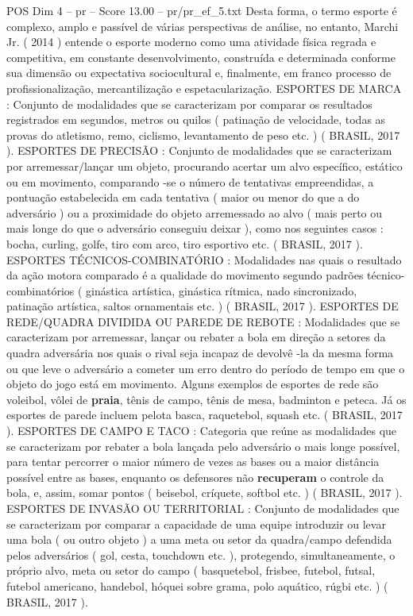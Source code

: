 \begin{textsample}{POS Dim 4 – pr – Score 13.00 – pr/pr\_ef\_5.txt}
Desta forma, o termo esporte é complexo, amplo e passível de várias perspectivas de análise, no entanto, Marchi Jr. ( 2014 ) entende o esporte moderno como uma atividade física regrada e competitiva, em constante desenvolvimento, construída e determinada conforme sua dimensão ou expectativa sociocultural e, finalmente, em franco processo de profissionalização, mercantilização e espetacularização.
ESPORTES DE MARCA : Conjunto de modalidades que se caracterizam por comparar os resultados registrados em segundos, metros ou quilos ( patinação de velocidade, todas as provas do atletismo, remo, ciclismo, levantamento de peso etc. ) ( BRASIL, 2017 ).
ESPORTES DE PRECISÃO : Conjunto de modalidades que se caracterizam por arremessar/lançar um objeto, procurando acertar um alvo específico, estático ou em movimento, comparando -se o número de tentativas empreendidas, a pontuação estabelecida em cada tentativa ( maior ou menor do que a do adversário ) ou a proximidade do objeto arremessado ao alvo ( mais perto ou mais longe do que o adversário conseguiu deixar ), como nos seguintes casos : bocha, curling, golfe, tiro com arco, tiro esportivo etc. ( BRASIL, 2017 ).
ESPORTES TÉCNICOS-COMBINATÓRIO : Modalidades nas quais o resultado da ação motora comparado é a qualidade do movimento segundo padrões técnico-combinatórios ( ginástica artística, ginástica rítmica, nado sincronizado, patinação artística, saltos ornamentais etc. ) ( BRASIL, 2017 ).
ESPORTES DE REDE/QUADRA DIVIDIDA OU PAREDE DE REBOTE : Modalidades que se caracterizam por arremessar, lançar ou rebater a bola em direção a setores da quadra adversária nos quais o rival seja incapaz de devolvê -la da mesma forma ou que leve o adversário a cometer um erro dentro do período de tempo em que o objeto do jogo está em movimento.
Alguns exemplos de esportes de rede são voleibol, vôlei de \textbf{praia}, tênis de campo, tênis de mesa, badminton e peteca.
Já os esportes de parede incluem pelota basca, raquetebol, squash etc. ( BRASIL, 2017 ).
ESPORTES DE CAMPO E TACO : Categoria que reúne as modalidades que se caracterizam por rebater a bola lançada pelo adversário o mais longe possível, para tentar percorrer o maior número de vezes as bases ou a maior distância possível entre as bases, enquanto os defensores não \textbf{recuperam} o controle da bola, e, assim, somar pontos ( beisebol, críquete, softbol etc. ) ( BRASIL, 2017 ).
ESPORTES DE INVASÃO OU TERRITORIAL : Conjunto de modalidades que se caracterizam por comparar a capacidade de uma equipe introduzir ou levar uma bola ( ou outro objeto ) a uma meta ou setor da quadra/campo defendida pelos adversários ( gol, cesta, touchdown etc. ), protegendo, simultaneamente, o próprio alvo, meta ou setor do campo ( basquetebol, frisbee, futebol, futsal, futebol americano, handebol, hóquei sobre grama, polo aquático, rúgbi etc. ) ( BRASIL, 2017 ).

\end{textsample}
